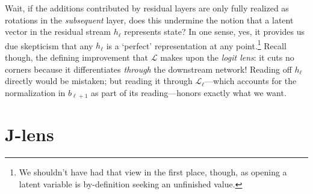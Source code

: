 \documentclass{article}
\newcommand{\jlens}{\mathscr{L}}
\begin{document}
Wait, if the additions contributed by residual layers are only fully realized as rotations in the \textit{subsequent} layer, does this undermine the notion that a latent vector in the residual stream \(h_\ell\) represents state? In one sense, yes, it provides us due skepticism that any \(h_\ell\) is a `perfect' representation at any point.\footnote{We shouldn't have had that view in the first place, though, as opening a latent variable is by-definition seeking an unfinished value.} Recall though, the defining improvement that \(\jlens\) makes upon the \textit{logit lens}: it cuts no corners because it differentiates \textit{through} the downstream network! Reading off \(h_\ell\) directly would be mistaken; but reading it through \(\jlens_\ell\)---which accounts for the normalization in \(b_{\ell+1}\) as part of its reading---honors exactly what we want.


\section{J-lens}
\end{document}
